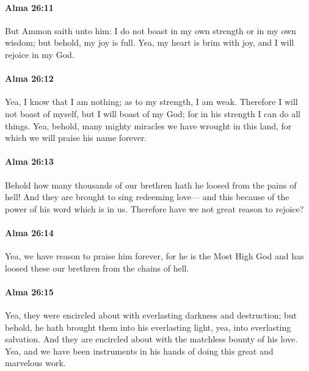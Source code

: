 		\paragraph{Alma 26:11} %
			\label{ALMA-26-11}

			But Ammon saith unto him:
			I do not boast in my own strength or in my own wisdom;
			but behold, my joy is full.
			Yea, my heart is brim with joy,
			and I will rejoice in my God.

		\paragraph{Alma 26:12} %
			\label{ALMA-26-12}

			Yea, I know that I am nothing;
			as to my strength, I am weak.
			Therefore I will not boast of myself, but I will boast of my God;
			for in his strength I can do all things.
			Yea, behold, many mighty miracles we have wrought in this land,
			for which we will praise his name forever.

		\paragraph{Alma 26:13} %
			\label{ALMA-26-13}

			Behold how many thousands of our brethren hath he loosed from the pains of hell!
			And they are brought to sing redeeming love---
			and this because of the power of his word which is in us.
			Therefore have we not great reason to rejoice?

		\paragraph{Alma 26:14} %
			\label{ALMA-26-14}

			Yea, we have reason to praise him forever,
			for he is the Most High God
			and has loosed these our brethren from the chains of hell.

		\paragraph{Alma 26:15} %
			\label{ALMA-26-15}

			Yea, they were encircled about with everlasting darkness and destruction;
			but behold, he hath brought them into his everlasting light,
			yea, into everlasting salvation.
			And they are encircled about with the matchless bounty of his love.
			Yea, and we have been instruments in his hands
			of doing this great and marvelous work.

